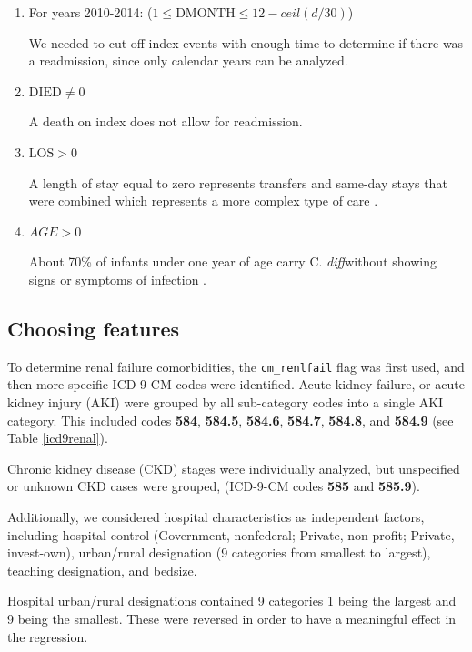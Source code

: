 \documentclass[12pt]{ociamthesis}\usepackage[]{graphicx}\usepackage[]{color}
\newcommand{\cdiff}{C. \textit{diff}}
\begin{document}
\begin{enumerate}
    \item For years 2010-2014: ($1 \le \text{DMONTH} \le 12 - ceil(d/30)$)
    
    We needed to cut off index events with enough time to determine if there was a readmission, since only calendar years can be analyzed.
    
    \item $\text{DIED} \ne 0$
    
    A death on index does not allow for readmission.
    
    \item $\text{LOS} > 0$
    
    A length of stay equal to zero represents transfers and same-day stays that were combined which represents a more complex type of care \cite{NRDIntroduction2013}.
    
    \item $AGE > 0$
  
    About 70\% of infants under one year of age carry \cdiff without showing signs or symptoms of infection \cite{Lamont2017}. 
    
\end{enumerate}




\subsection{Choosing features}

To determine renal failure comorbidities, the \texttt{cm\_renlfail} flag was first used, and then more specific ICD-9-CM codes were identified. Acute kidney failure, 
or acute kidney injury (AKI) were grouped by all sub-category codes into a single AKI category. This included codes \textbf{584}, \textbf{584.5}, \textbf{584.6}, \textbf{584.7}, 
\textbf{584.8}, and \textbf{584.9} (see Table \ref{icd9renal}).

Chronic kidney disease (CKD) stages were individually analyzed, but unspecified or unknown CKD cases were grouped, (ICD-9-CM codes \textbf{585} and \textbf{585.9}). 

Additionally, we considered hospital characteristics as independent factors, including hospital control (Government, nonfederal; Private, non-profit; Private, invest-own), 
urban/rural designation (9 categories from smallest to largest), teaching designation, and bedsize. 

Hospital urban/rural designations contained 9 categories 1 being the largest and 9 being the smallest. These were reversed in order to have a meaningful effect in the regression.
\end{document}
